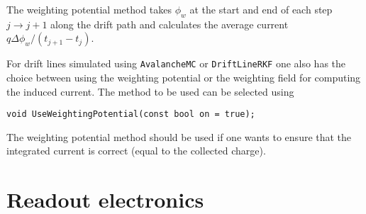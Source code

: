 The weighting potential method takes $\phi_{w}$ 
at the start and end of each step $j \rightarrow j + 1$ along the drift path
and calculates the average current $q\Delta\phi_{w}/\left(t_{j+1} - t_{j}\right)$.

For drift lines simulated using \texttt{AvalancheMC} or 
\texttt{DriftLineRKF} one also has the choice 
between using the weighting potential or the weighting field for computing 
the induced current. The method to be used can be selected using
\begin{lstlisting}
void UseWeightingPotential(const bool on = true);
\end{lstlisting} 
The weighting potential method should be used if one wants to ensure that 
the integrated current is correct (equal to the collected charge).
\section{Readout electronics}

